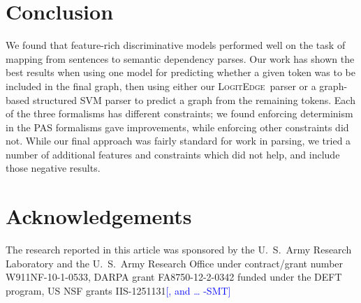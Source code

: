 \documentclass[11pt]{article}
\newcommand{\sam}[1]{\textcolor{blue}{[#1 -SMT]}}
\newcommand{\logitedge}{\textsc{LogitEdge}}
\begin{document}
\section{Conclusion}
We found that feature-rich discriminative models performed well on the task of
mapping from sentences to semantic dependency parses.
Our work has shown the best results when using one model for predicting whether
a given token was to be included in the final graph, then using either our
\logitedge\ parser or a graph-based structured SVM parser to predict a graph
from the remaining tokens.
Each of the three formalisms has different constraints;
we found enforcing determinism in the PAS formalisms gave improvements, while
enforcing other constraints did not.
While our final approach was fairly standard for work in parsing, we tried a
number of additional features and constraints which did not help, and include
those negative results.



\section*{Acknowledgements}
The research reported in this article was sponsored by the U.~S.~Army Research
Laboratory and the U.~S.~Army Research Office under contract/grant number
W911NF-10-1-0533, DARPA grant FA8750-12-2-0342 funded under the DEFT program, US
NSF grants IIS-1251131\sam{, and \ldots}




\end{document}
